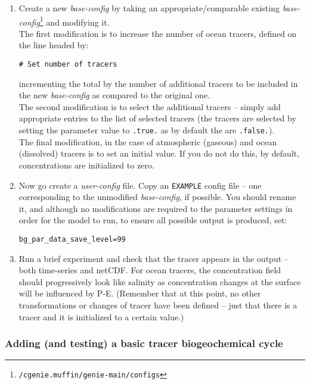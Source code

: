 \documentclass[11pt,fleqn]{book} %
\begin{document}
\begin{enumerate}
\item
Create a new \textit{base-config} by taking an appropriate/comparable existing \textit{base-config}\footnote{\texttt{/cgenie.muffin/genie-main/configs}} and modifying it.
\\The first modification is to increase the number of ocean tracers, defined on the line headed by:
\vspace{-10pt}\begin{verbatim}
# Set number of tracers
\end{verbatim}\vspace{-10pt}
incrementing the total by the number of additional tracers to be included in the new \textit{base-config} as compared to the original one.
\\The second modification is to select the additional tracers -- simply add appropriate entries to the list of selected tracers (the tracers are selected by setting the parameter value to \texttt{.true.} as by default the are \texttt{.false.}).
\\The final modification, in the case of atmospheric (gaseous) and  ocean (dissolved) tracers is to set an initial value. If you do not do this, by default, concentrations are initialized to zero.
\item
Now go create a \textit{user-config} file. Copy an \texttt{EXAMPLE} config file -- one corresponding to the unmodified \textit{base-config}, if possible. You should rename it, and although no modifications are required to the parameter settings in order for the model to run, to ensure all possible output is produced, set:
\vspace{-10pt}\begin{verbatim}
bg_par_data_save_level=99
\end{verbatim}\vspace{-10pt}
\item
Run a brief experiment and check that the tracer appears in the output -- both time-series and netCDF. For ocean tracers, the concentration field should progressively look like salinity as concentration changes at the surface will be influenced by P-E. (Remember that at this point, no other transformations or changes of tracer have been defined -- just that there is a tracer and it is initialized to a certain value.)
\end{enumerate}

%
\subsubsection{Adding (and testing) a basic tracer biogeochemical cycle}
\end{document}
